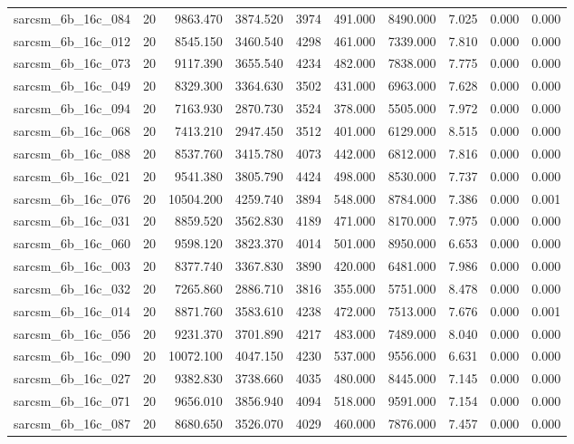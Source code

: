 \begin{tabular}{lrrrrrrrrr}
sarcsm\_6b\_16c\_084 & 20 & 9863.470 & 3874.520 & 3974 & 491.000 & 8490.000 & 7.025 & 0.000 & 0.000 \\
sarcsm\_6b\_16c\_012 & 20 & 8545.150 & 3460.540 & 4298 & 461.000 & 7339.000 & 7.810 & 0.000 & 0.000 \\
sarcsm\_6b\_16c\_073 & 20 & 9117.390 & 3655.540 & 4234 & 482.000 & 7838.000 & 7.775 & 0.000 & 0.000 \\
sarcsm\_6b\_16c\_049 & 20 & 8329.300 & 3364.630 & 3502 & 431.000 & 6963.000 & 7.628 & 0.000 & 0.000 \\
sarcsm\_6b\_16c\_094 & 20 & 7163.930 & 2870.730 & 3524 & 378.000 & 5505.000 & 7.972 & 0.000 & 0.000 \\
sarcsm\_6b\_16c\_068 & 20 & 7413.210 & 2947.450 & 3512 & 401.000 & 6129.000 & 8.515 & 0.000 & 0.000 \\
sarcsm\_6b\_16c\_088 & 20 & 8537.760 & 3415.780 & 4073 & 442.000 & 6812.000 & 7.816 & 0.000 & 0.000 \\
sarcsm\_6b\_16c\_021 & 20 & 9541.380 & 3805.790 & 4424 & 498.000 & 8530.000 & 7.737 & 0.000 & 0.000 \\
sarcsm\_6b\_16c\_076 & 20 & 10504.200 & 4259.740 & 3894 & 548.000 & 8784.000 & 7.386 & 0.000 & 0.001 \\
sarcsm\_6b\_16c\_031 & 20 & 8859.520 & 3562.830 & 4189 & 471.000 & 8170.000 & 7.975 & 0.000 & 0.000 \\
sarcsm\_6b\_16c\_060 & 20 & 9598.120 & 3823.370 & 4014 & 501.000 & 8950.000 & 6.653 & 0.000 & 0.000 \\
sarcsm\_6b\_16c\_003 & 20 & 8377.740 & 3367.830 & 3890 & 420.000 & 6481.000 & 7.986 & 0.000 & 0.000 \\
sarcsm\_6b\_16c\_032 & 20 & 7265.860 & 2886.710 & 3816 & 355.000 & 5751.000 & 8.478 & 0.000 & 0.000 \\
sarcsm\_6b\_16c\_014 & 20 & 8871.760 & 3583.610 & 4238 & 472.000 & 7513.000 & 7.676 & 0.000 & 0.001 \\
sarcsm\_6b\_16c\_056 & 20 & 9231.370 & 3701.890 & 4217 & 483.000 & 7489.000 & 8.040 & 0.000 & 0.000 \\
sarcsm\_6b\_16c\_090 & 20 & 10072.100 & 4047.150 & 4230 & 537.000 & 9556.000 & 6.631 & 0.000 & 0.000 \\
sarcsm\_6b\_16c\_027 & 20 & 9382.830 & 3738.660 & 4035 & 480.000 & 8445.000 & 7.145 & 0.000 & 0.000 \\
sarcsm\_6b\_16c\_071 & 20 & 9656.010 & 3856.940 & 4094 & 518.000 & 9591.000 & 7.154 & 0.000 & 0.000 \\
sarcsm\_6b\_16c\_087 & 20 & 8680.650 & 3526.070 & 4029 & 460.000 & 7876.000 & 7.457 & 0.000 & 0.000 \\

\end{tabular}
